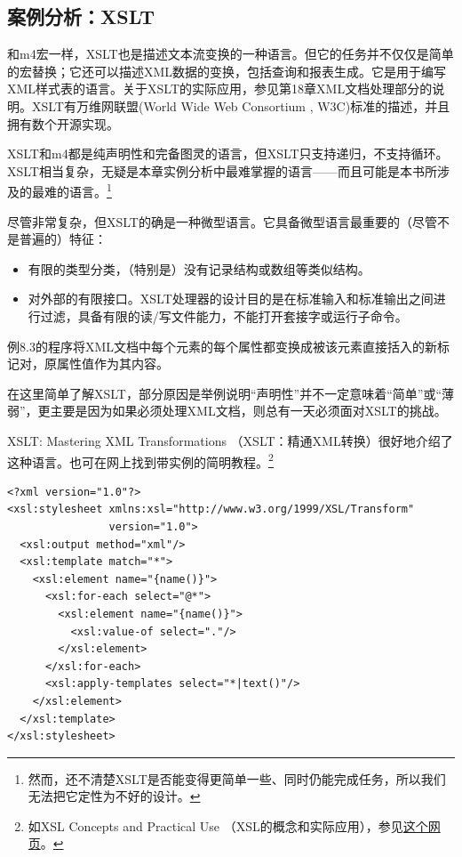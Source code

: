 \documentclass[12pt,oneside]{book}
\begin{document}
\subsection{案例分析：XSLT}
和m4宏一样，XSLT也是描述文本流变换的一种语言。但它的任务并不仅仅是简单的宏替换；它还可以描述XML数据的变换，包括查询和报表生成。它是用于编写XML样式表的语言。关于XSLT的实际应用，参见第18章XML文档处理部分的说明。XSLT有万维网联盟(World Wide Web Consortium , W3C)标准的描述，并且拥有数个开源实现。

XSLT和m4都是纯声明性和完备图灵的语言，但XSLT只支持递归，不支持循环。XSLT相当复杂，无疑是本章实例分析中最难掌握的语言——而且可能是本书所涉及的最难的语言。\footnote{然而，还不清楚XSLT是否能变得更简单一些、同时仍能完成任务，所以我们无法把它定性为不好的设计。}

尽管非常复杂，但XSLT的确是一种微型语言。它具备微型语言最重要的（尽管不是普遍的）特征：
\begin{itemize}
\item 有限的类型分类，（特别是）没有记录结构或数组等类似结构。
\item 对外部的有限接口。XSLT处理器的设计目的是在标准输入和标准输出之间进行过滤，具备有限的读/写文件能力，不能打开套接字或运行子命令。
\end{itemize}

例8.3的程序将XML文档中每个元素的每个属性都变换成被该元素直接括入的新标记对，原属性值作为其内容。

在这里简单了解XSLT，部分原因是举例说明“声明性”并不一定意味着“简单”或“薄弱”，更主要是因为如果必须处理XML文档，则总有一天必须面对XSLT的挑战。

XSLT: Mastering XML Transformations （XSLT：精通XML转换）\cite{Tidwell}很好地介绍了这种语言。也可在网上找到带实例的简明教程。\footnote{如XSL Concepts and Practical Use （XSL的概念和实际应用），参见\href{http://nwalsh.com/docs/tutorials/xsl/xsl/slides.html}{这个网页}。}


\begin{Verbatim}[label=例 8.3 XSLT程序实例]
<?xml version="1.0"?>
<xsl:stylesheet xmlns:xsl="http://www.w3.org/1999/XSL/Transform" 
                version="1.0">
  <xsl:output method="xml"/>
  <xsl:template match="*">
    <xsl:element name="{name()}">
      <xsl:for-each select="@*">
        <xsl:element name="{name()}">
          <xsl:value-of select="."/>
        </xsl:element>
      </xsl:for-each>
      <xsl:apply-templates select="*|text()"/>
    </xsl:element>
  </xsl:template> 
</xsl:stylesheet>
\end{Verbatim}
\end{document}
